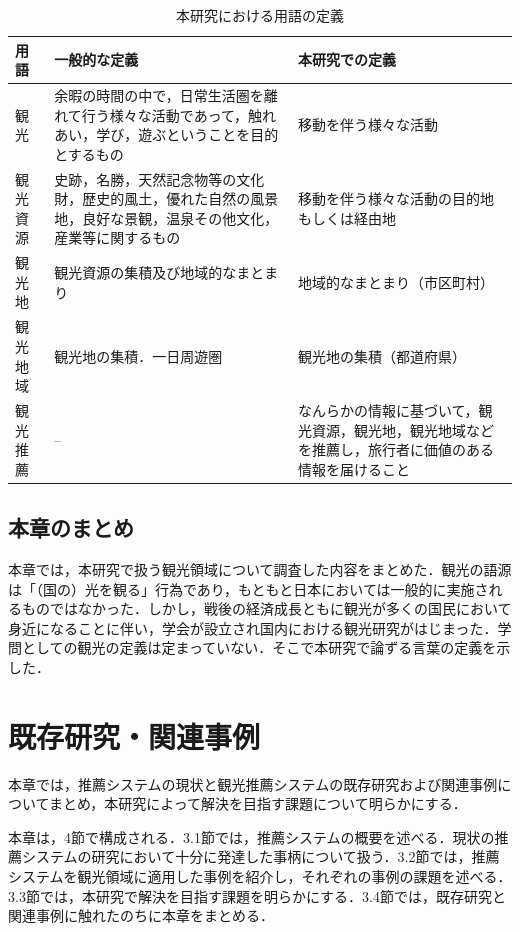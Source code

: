 \documentclass{jsarticle}
\begin{document}
\begin{table}[!h]
\small
\caption{本研究における用語の定義}
\begin{center}
\begin{tabular}{lp{}p{}}
\label{define_of_tourism}
用語 & 一般的な定義 & 本研究での定義 \\ \hline
観光        & 余暇の時間の中で，日常生活圏を離れて行う様々な活動であって，触れあい，学び，遊ぶということを目的とするもの        & 移動を伴う様々な活動 \\
観光資源    & 史跡，名勝，天然記念物等の文化財，歴史的風土，優れた自然の風景地，良好な景観，温泉その他文化，産業等に関するもの  & 移動を伴う様々な活動の目的地もしくは経由地 \\
観光地      & 観光資源の集積及び地域的なまとまり    & 地域的なまとまり（市区町村） \\
観光地域    & 観光地の集積．一日周遊圏              & 観光地の集積（都道府県） \\
観光推薦    & --                                    & なんらかの情報に基づいて，観光資源，観光地，観光地域などを推薦し，旅行者に価値のある情報を届けること
\end{tabular}
\end{center}
\end{table}

\subsection{本章のまとめ}

本章では，本研究で扱う観光領域について調査した内容をまとめた．観光の語源は「（国の）光を観る」行為であり，もともと日本においては一般的に実施されるものではなかった．しかし，戦後の経済成長ともに観光が多くの国民において身近になることに伴い，学会が設立され国内における観光研究がはじまった．学問としての観光の定義は定まっていない．そこで本研究で論ずる言葉の定義を示した．

\newpage

\section{既存研究・関連事例}

本章では，推薦システムの現状と観光推薦システムの既存研究および関連事例についてまとめ，本研究によって解決を目指す課題について明らかにする．

本章は，4節で構成される．3.1節では，推薦システムの概要を述べる．現状の推薦システムの研究において十分に発達した事柄について扱う．3.2節では，推薦システムを観光領域に適用した事例を紹介し，それぞれの事例の課題を述べる．3.3節では，本研究で解決を目指す課題を明らかにする．3.4節では，既存研究と関連事例に触れたのちに本章をまとめる．
\end{document}
